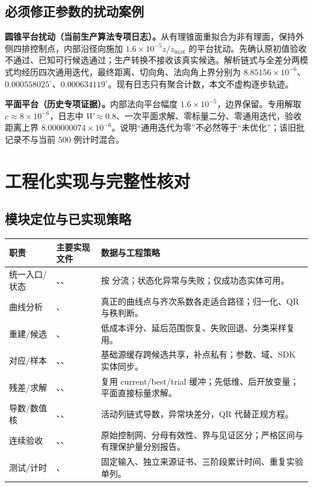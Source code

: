 \subsection{必须修正参数的扰动案例}
\textbf{圆锥平台扰动（当前生产算法专项日志）。}从有理锥面重拟合为非有理面，保持外侧四排控制点，内部沿径向施加 $1.6\times10^{-5}z/z_{\max}$ 的平台扰动。先确认原初值验收不通过、已知可行候选通过；生产转换不接收该真实候选。解析链式与全差分两模式均经历四次通用迭代，最终距离、切向角、法向角上界分别为 $8.85156\times10^{-6}$、$0.000558025^\circ$、$0.000634119^\circ$。现有日志只有聚合计数，本文不虚构逐步轨迹。

\textbf{平面平台（历史专项证据）。}内部法向平台幅度 $1.6\times10^{-5}$，边界保留。专用解取 $c\approx8\times10^{-6}$，日志中 $W\approx0.8$、一次平面求解、零标量二分、零通用迭代，验收距离上界 $8.000000074\times10^{-6}$。说明“通用迭代为零”不必然等于“未优化”；该旧批记录不与当前 500 例计时混合。


\clearpage
\section{工程化实现与完整性核对}
\subsection{模块定位与已实现策略}
\par{\small\begin{tabularx}{\linewidth}{@{}l Y Y@{}}\toprule
职责 & 主要实现文件 & 数据与工程策略\\\midrule
统一入口/状态 & 、、 & 按  分流；状态化异常与失败；仅成功态实体可用。\\
曲线分析 & 、 & 真正的曲线点与齐次系数各走适合路径；归一化、QR 与秩判断。\\
重建/候选 & 、 & 低成本评分、延后范围恢复、失败回退、分类采样复用。\\
对应/样本 & 、、 & 基础源缓存跨候选共享，补点私有；参数、域、SDK 实体同步。\\
残差/求解 & 、、 & 复用 current/best/trial 缓冲；先低维、后开放变量；平面直接标量求解。\\
导数/数值核 & 、、 & 活动列链式导数，异常块差分，QR 代替正规方程。\\
连续验收 & 、、 & 原始控制网、分母有效性、界与见证区分；严格区间与有理保护量分别报告。\\
测试/计时 & 、 & 固定输入、独立来源证书、三阶段累计时间、重复实验单列。\\\bottomrule
\end{tabularx}}

